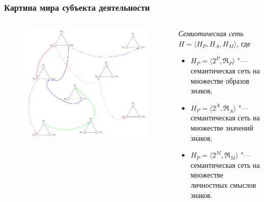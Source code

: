 \documentclass[default]{beamer}
\begin{document}
	\begin{frame}
		\frametitle{Картина мира субъекта деятельности}
		
		\begin{columns}
			\begin{column}{0.55\textwidth}
				\begin{figure}
					\includegraphics[width=\textwidth]{signs/signs_net}
				\end{figure}
			\end{column}
			\begin{column}{0.45\textwidth}
				\textit{Семиотическая сеть} $H=\langle H_P, H_A, H_M\rangle$, где
				\begin{itemize}
					\item $H_P=\langle2^P,\mathfrak R_P\rangle$ "--- семантическая сеть на множестве образов знаков,
					\item $H_P=\langle2^A,\mathfrak R_A\rangle$ "--- семантическая сеть на множестве значений знаков,
					\item $H_P=\langle2^M,\mathfrak R_M\rangle$ "--- семантическая сеть на множестве личностных смыслов знаков.
				\end{itemize}
			\end{column}
		\end{columns}
	\end{frame}		
\end{document}
